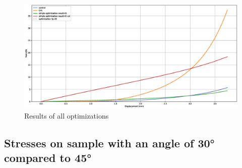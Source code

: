 \documentclass[12pt]{article}
\begin{document}
\begin{figure}[!htb]
  \centering
  \includegraphics[width=0.8\linewidth]{pics/optimizations}
 \caption{Results of all optimizations}
  \label{fig:3}
\end{figure}
\pagebreak

\subsection{Stresses on sample with an angle of \ang{30} compared to \ang{45}}
\end{document}
